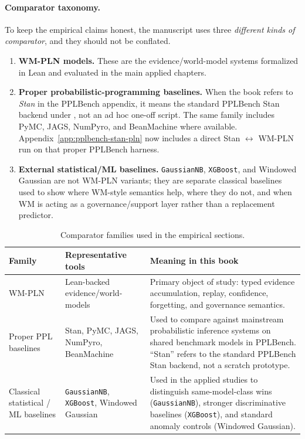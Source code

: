 \documentclass[11pt,openany]{report}
\begin{document}
\paragraph{Comparator taxonomy.}
To keep the empirical claims honest, the manuscript uses three
\emph{different kinds of comparator}, and they should not be conflated.
\begin{enumerate}
\item \textbf{WM-PLN models.} These are the evidence/world-model systems
formalized in Lean and evaluated in the main applied chapters.
\item \textbf{Proper probabilistic-programming baselines.} When the book
refers to \emph{Stan} in the PPLBench appendix, it means the standard
PPLBench Stan backend under , not an
ad hoc one-off script.  The same family includes PyMC, JAGS, NumPyro,
and BeanMachine where available.  Appendix~\ref{app:pplbench-stan-pln}
now includes a direct  Stan $\leftrightarrow$
WM-PLN run on that proper PPLBench harness.
\item \textbf{External statistical/ML baselines.} \texttt{GaussianNB},
\texttt{XGBoost}, and Windowed Gaussian are not WM-PLN variants; they are
separate classical baselines used to show where WM-style semantics help,
where they do not, and when WM is acting as a governance/support layer
rather than a replacement predictor.
\end{enumerate}

\begin{table}[htbp]
\centering
\footnotesize
\setlength{\tabcolsep}{4pt}
\renewcommand{\arraystretch}{0.96}
\caption{Comparator families used in the empirical sections.}
\label{tab:comparator-taxonomy}
\begin{tabular}{p{2.6cm}p{3.0cm}p{7.8cm}}
\toprule
Family & Representative tools & Meaning in this book \\
\midrule
WM-PLN &
Lean-backed evidence/world-models &
Primary object of study: typed evidence accumulation, replay, confidence,
forgetting, and governance semantics. \\
\addlinespace
Proper PPL baselines &
Stan, PyMC, JAGS, NumPyro, BeanMachine &
Used to compare against mainstream probabilistic inference systems on
shared benchmark models in PPLBench.  ``Stan'' refers to the standard
PPLBench Stan backend, not a scratch prototype. \\
\addlinespace
Classical statistical / ML baselines &
\texttt{GaussianNB}, \texttt{XGBoost}, Windowed Gaussian &
Used in the applied studies to distinguish same-model-class wins
(\texttt{GaussianNB}), stronger discriminative baselines
(\texttt{XGBoost}), and standard anomaly controls (Windowed Gaussian). \\
\bottomrule
\end{tabular}
\end{table}
\end{document}
